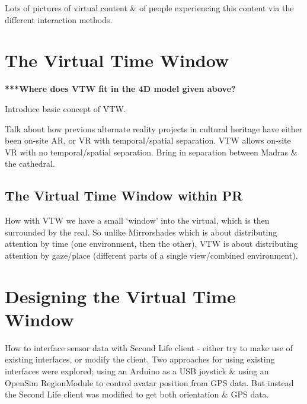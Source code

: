 Lots of pictures of virtual content \& of people experiencing this content via the different interaction methods.





\section{The Virtual Time Window}

\textbf{***Where does VTW fit in the 4D model given above?}

Introduce basic concept of VTW.

Talk about how previous alternate reality projects in cultural heritage have either been on-site AR, or VR with temporal/spatial separation. VTW allows on-site VR with no temporal/spatial separation. Bring in separation between Madras \& the cathedral.


\subsection{The Virtual Time Window within PR}

How with VTW we have a small `window' into the virtual, which is then surrounded by the real. So unlike Mirrorshades which is about distributing attention by time (one environment, then the other), VTW is about distributing attention by gaze/place (different parts of a single view/combined environment).


\section{Designing the Virtual Time Window}

How to interface sensor data with Second Life client - either try to make use of existing interfaces, or modify the client. Two approaches for using existing interfaces were explored; using an Arduino as a USB joystick \& using an OpenSim RegionModule to control avatar position from GPS data. But instead the Second Life client was modified to get both orientation \& GPS data.

